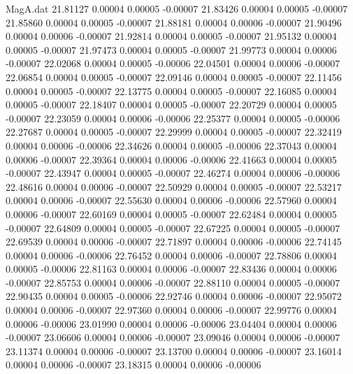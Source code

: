 \begin{filecontents}{MagA.dat}
  21.81127    0.00004    0.00005   -0.00007
  21.83426    0.00004    0.00005   -0.00007
  21.85860    0.00004    0.00005   -0.00007
  21.88181    0.00004    0.00006   -0.00007
  21.90496    0.00004    0.00006   -0.00007
  21.92814    0.00004    0.00005   -0.00007
  21.95132    0.00004    0.00005   -0.00007
  21.97473    0.00004    0.00005   -0.00007
  21.99773    0.00004    0.00006   -0.00007
  22.02068    0.00004    0.00005   -0.00006
  22.04501    0.00004    0.00006   -0.00007
  22.06854    0.00004    0.00005   -0.00007
  22.09146    0.00004    0.00005   -0.00007
  22.11456    0.00004    0.00005   -0.00007
  22.13775    0.00004    0.00005   -0.00007
  22.16085    0.00004    0.00005   -0.00007
  22.18407    0.00004    0.00005   -0.00007
  22.20729    0.00004    0.00005   -0.00007
  22.23059    0.00004    0.00006   -0.00006
  22.25377    0.00004    0.00005   -0.00006
  22.27687    0.00004    0.00005   -0.00007
  22.29999    0.00004    0.00005   -0.00007
  22.32419    0.00004    0.00006   -0.00006
  22.34626    0.00004    0.00005   -0.00006
  22.37043    0.00004    0.00006   -0.00007
  22.39364    0.00004    0.00006   -0.00006
  22.41663    0.00004    0.00005   -0.00007
  22.43947    0.00004    0.00005   -0.00007
  22.46274    0.00004    0.00006   -0.00006
  22.48616    0.00004    0.00006   -0.00007
  22.50929    0.00004    0.00005   -0.00007
  22.53217    0.00004    0.00006   -0.00007
  22.55630    0.00004    0.00006   -0.00006
  22.57960    0.00004    0.00006   -0.00007
  22.60169    0.00004    0.00005   -0.00007
  22.62484    0.00004    0.00005   -0.00007
  22.64809    0.00004    0.00005   -0.00007
  22.67225    0.00004    0.00005   -0.00007
  22.69539    0.00004    0.00006   -0.00007
  22.71897    0.00004    0.00006   -0.00006
  22.74145    0.00004    0.00006   -0.00006
  22.76452    0.00004    0.00006   -0.00007
  22.78806    0.00004    0.00005   -0.00006
  22.81163    0.00004    0.00006   -0.00007
  22.83436    0.00004    0.00006   -0.00007
  22.85753    0.00004    0.00006   -0.00007
  22.88110    0.00004    0.00005   -0.00007
  22.90435    0.00004    0.00005   -0.00006
  22.92746    0.00004    0.00006   -0.00007
  22.95072    0.00004    0.00006   -0.00007
  22.97360    0.00004    0.00006   -0.00007
  22.99776    0.00004    0.00006   -0.00006
  23.01990    0.00004    0.00006   -0.00006
  23.04404    0.00004    0.00006   -0.00007
  23.06606    0.00004    0.00006   -0.00007
  23.09046    0.00004    0.00006   -0.00007
  23.11374    0.00004    0.00006   -0.00007
  23.13700    0.00004    0.00006   -0.00007
  23.16014    0.00004    0.00006   -0.00007
  23.18315    0.00004    0.00006   -0.00006

\end{filecontents}
